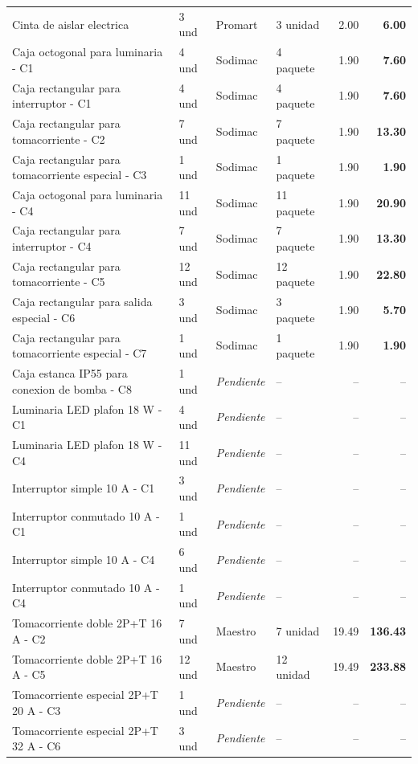 \begin{longtable}{p{5.0cm} p{1.5cm} p{2.2cm} p{2.2cm} r r}
Cinta de aislar electrica & 3 und & Promart & 3 unidad & 2.00 & \textbf{6.00} \\
Caja octogonal para luminaria - C1 & 4 und & Sodimac & 4 paquete & 1.90 & \textbf{7.60} \\
Caja rectangular para interruptor - C1 & 4 und & Sodimac & 4 paquete & 1.90 & \textbf{7.60} \\
Caja rectangular para tomacorriente - C2 & 7 und & Sodimac & 7 paquete & 1.90 & \textbf{13.30} \\
Caja rectangular para tomacorriente especial - C3 & 1 und & Sodimac & 1 paquete & 1.90 & \textbf{1.90} \\
Caja octogonal para luminaria - C4 & 11 und & Sodimac & 11 paquete & 1.90 & \textbf{20.90} \\
Caja rectangular para interruptor - C4 & 7 und & Sodimac & 7 paquete & 1.90 & \textbf{13.30} \\
Caja rectangular para tomacorriente - C5 & 12 und & Sodimac & 12 paquete & 1.90 & \textbf{22.80} \\
Caja rectangular para salida especial - C6 & 3 und & Sodimac & 3 paquete & 1.90 & \textbf{5.70} \\
Caja rectangular para tomacorriente especial - C7 & 1 und & Sodimac & 1 paquete & 1.90 & \textbf{1.90} \\
Caja estanca IP55 para conexion de bomba - C8 & 1 und & \textit{Pendiente} & -- & -- & -- \\
Luminaria LED plafon 18 W - C1 & 4 und & \textit{Pendiente} & -- & -- & -- \\
Luminaria LED plafon 18 W - C4 & 11 und & \textit{Pendiente} & -- & -- & -- \\
Interruptor simple 10 A - C1 & 3 und & \textit{Pendiente} & -- & -- & -- \\
Interruptor conmutado 10 A - C1 & 1 und & \textit{Pendiente} & -- & -- & -- \\
Interruptor simple 10 A - C4 & 6 und & \textit{Pendiente} & -- & -- & -- \\
Interruptor conmutado 10 A - C4 & 1 und & \textit{Pendiente} & -- & -- & -- \\
Tomacorriente doble 2P+T 16 A - C2 & 7 und & Maestro & 7 unidad & 19.49 & \textbf{136.43} \\
Tomacorriente doble 2P+T 16 A - C5 & 12 und & Maestro & 12 unidad & 19.49 & \textbf{233.88} \\
Tomacorriente especial 2P+T 20 A - C3 & 1 und & \textit{Pendiente} & -- & -- & -- \\
Tomacorriente especial 2P+T 32 A - C6 & 3 und & \textit{Pendiente} & -- & -- & -- \\

\end{longtable}
